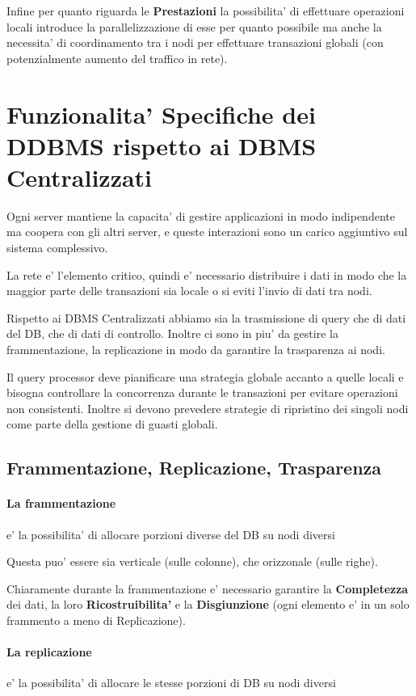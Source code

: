Infine per quanto riguarda le \textbf{Prestazioni} la possibilita' di effettuare operazioni locali introduce la parallelizzazione di esse per quanto possibile ma anche la necessita' di coordinamento tra i nodi per effettuare transazioni globali (con potenzialmente aumento del traffico in rete).

\section{Funzionalita' Specifiche dei DDBMS rispetto ai DBMS Centralizzati}

Ogni server mantiene la capacita' di gestire applicazioni in modo indipendente ma coopera con gli altri server, e queste interazioni sono un carico aggiuntivo sul sistema complessivo.

La rete e' l'elemento critico, quindi e' necessario distribuire i dati in modo che la maggior parte delle transazioni sia locale o si eviti l'invio di dati tra nodi.

Rispetto ai DBMS Centralizzati abbiamo sia la trasmissione di query che di dati del DB, che di dati di controllo. Inoltre ci sono in piu' da gestire la frammentazione, la replicazione in modo da garantire la trasparenza ai nodi.

Il query processor deve pianificare una strategia globale accanto a quelle locali e bisogna controllare la concorrenza durante le transazioni per evitare operazioni non consistenti. Inoltre si devono prevedere strategie di ripristino dei singoli nodi come parte della gestione di guasti globali.

\subsection{Frammentazione, Replicazione, Trasparenza}

\paragraph{La frammentazione} e' la possibilita' di allocare porzioni diverse del DB su nodi diversi

Questa puo' essere sia verticale (sulle colonne), che orizzonale (sulle righe).

Chiaramente durante la frammentazione e' necessario garantire la \textbf{Completezza} dei dati, la loro \textbf{Ricostruibilita'} e la \textbf{Disgiunzione} (ogni elemento e' in un solo frammento a meno di Replicazione).

\paragraph{La replicazione} e' la possibilita' di allocare le stesse porzioni di DB su nodi diversi

